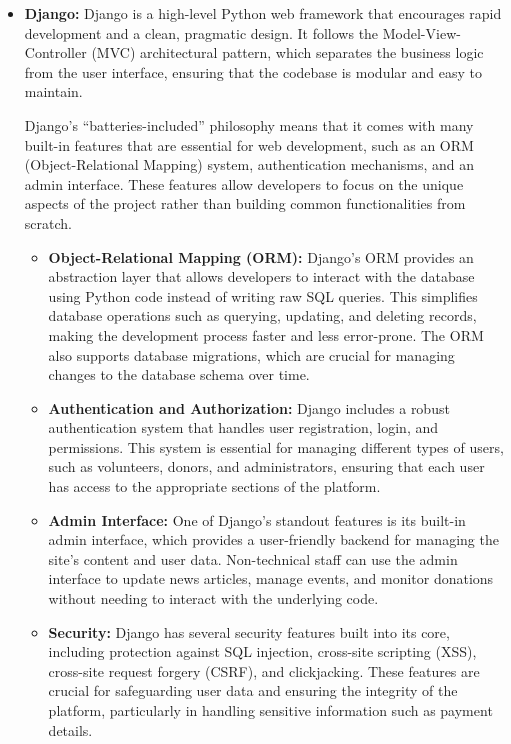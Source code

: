 \begin{itemize}
    \item \textbf{Django:} Django is a high-level Python web framework that encourages rapid development and a clean, pragmatic design. It follows the Model-View-Controller (MVC) architectural pattern, which separates the business logic from the user interface, ensuring that the codebase is modular and easy to maintain.

    Django’s “batteries-included” philosophy means that it comes with many built-in features that are essential for web development, such as an ORM (Object-Relational Mapping) system, authentication mechanisms, and an admin interface. These features allow developers to focus on the unique aspects of the project rather than building common functionalities from scratch.

    \begin{itemize}
        \item \textbf{Object-Relational Mapping (ORM):} Django's ORM provides an abstraction layer that allows developers to interact with the database using Python code instead of writing raw SQL queries. This simplifies database operations such as querying, updating, and deleting records, making the development process faster and less error-prone. The ORM also supports database migrations, which are crucial for managing changes to the database schema over time.

        \item \textbf{Authentication and Authorization:} Django includes a robust authentication system that handles user registration, login, and permissions. This system is essential for managing different types of users, such as volunteers, donors, and administrators, ensuring that each user has access to the appropriate sections of the platform.

        \item \textbf{Admin Interface:} One of Django’s standout features is its built-in admin interface, which provides a user-friendly backend for managing the site’s content and user data. Non-technical staff can use the admin interface to update news articles, manage events, and monitor donations without needing to interact with the underlying code.

        \item \textbf{Security:} Django has several security features built into its core, including protection against SQL injection, cross-site scripting (XSS), cross-site request forgery (CSRF), and clickjacking. These features are crucial for safeguarding user data and ensuring the integrity of the platform, particularly in handling sensitive information such as payment details.
    \end{itemize}
\end{itemize}

